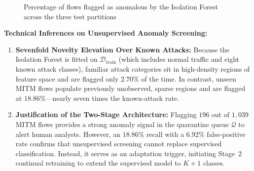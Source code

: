 \begin{figure}[htbp]
  \centering
  \caption{Percentage of flows flagged as anomalous by the Isolation Forest across the three test partitions}
  \label{fig:phase5_partition_rates_tikz}
\end{figure}

\textbf{Technical Inferences on Unsupervised Anomaly Screening:}
\begin{enumerate}
    \item \textbf{Sevenfold Novelty Elevation Over Known Attacks:} Because the Isolation Forest is fitted on $\mathcal{D}_{\text{train}}$ (which includes normal traffic and eight known attack classes), familiar attack categories sit in high-density regions of feature space and are flagged only $2.70\%$ of the time. In contrast, unseen MITM flows populate previously unobserved, sparse regions and are flagged at $18.86\%$---nearly seven times the known-attack rate.
    \item \textbf{Justification of the Two-Stage Architecture:} Flagging $196$ out of $1{,}039$ MITM flows provides a strong anomaly signal in the quarantine queue $\mathcal{Q}$ to alert human analysts. However, an $18.86\%$ recall with a $6.92\%$ false-positive rate confirms that unsupervised screening cannot replace supervised classification. Instead, it serves as an adaptation trigger, initiating Stage~2 continual retraining to extend the supervised model to $K+1$ classes.
\end{enumerate}

